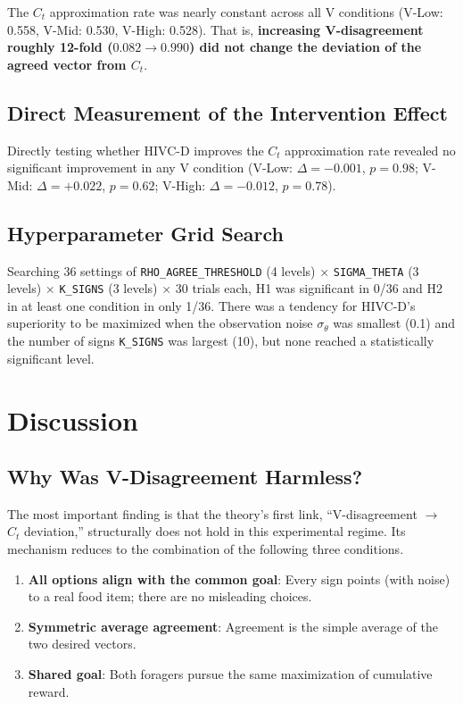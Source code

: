 \documentclass[11pt]{article}
\newcommand{\Ct}{\ensuremath{C_t}}
\begin{document}
The \Ct{} approximation rate was nearly constant across all V conditions (V-Low: 0.558, V-Mid: 0.530, V-High: 0.528). That is, \textbf{increasing V-disagreement roughly 12-fold ($0.082\to0.990$) did not change the deviation of the agreed vector from \Ct{}}.

\subsection{Direct Measurement of the Intervention Effect}

Directly testing whether HIVC-D improves the \Ct{} approximation rate revealed no significant improvement in any V condition (V-Low: $\Delta=-0.001$, $p=0.98$; V-Mid: $\Delta=+0.022$, $p=0.62$; V-High: $\Delta=-0.012$, $p=0.78$).

\subsection{Hyperparameter Grid Search}

Searching 36 settings of \texttt{RHO\_AGREE\_THRESHOLD} (4 levels) $\times$ \texttt{SIGMA\_THETA} (3 levels) $\times$ \texttt{K\_SIGNS} (3 levels) $\times$ 30 trials each, H1 was significant in 0/36 and H2 in at least one condition in only 1/36. There was a tendency for HIVC-D's superiority to be maximized when the observation noise $\sigma_\theta$ was smallest (0.1) and the number of signs \texttt{K\_SIGNS} was largest (10), but none reached a statistically significant level.

\section{Discussion}

\subsection{Why Was V-Disagreement Harmless?}

The most important finding is that the theory's first link, ``V-disagreement $\to$ \Ct{} deviation,'' structurally does not hold in this experimental regime. Its mechanism reduces to the combination of the following three conditions.

\begin{enumerate}[nosep]
  \item \textbf{All options align with the common goal}: Every sign points (with noise) to a real food item; there are no misleading choices.
  \item \textbf{Symmetric average agreement}: Agreement is the simple average of the two desired vectors.
  \item \textbf{Shared goal}: Both foragers pursue the same maximization of cumulative reward.
\end{enumerate}
\end{document}
